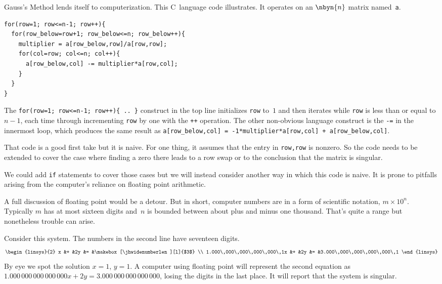 Gauss's Method lends itself to computerization.
This C~language 
code illustrates.
It operates on an $\nbyn{n}$ matrix named~\lstinline[style=inline]!a!.
\begin{lstlisting}
for(row=1; row<=n-1; row++){
  for(row_below=row+1; row_below<=n; row_below++){
    multiplier = a[row_below,row]/a[row,row];
    for(col=row; col<=n; col++){
      a[row_below,col] -= multiplier*a[row,col];
    }
  }
}
\end{lstlisting}
The 
\lstinline[style=inline]!for(row=1; row<=n-1; row++){ .. }!
construct in the top line
initializes \lstinline[style=inline]!row! to~$1$ and then iterates while
\lstinline[style=inline]!row! is less than or equal to $n-1$, each time through
incrementing \lstinline[style=inline]!row! by one with the 
\lstinline[style=inline]!++! operation.
The other non-obvious language 
construct is the \lstinline[style=inline]!-=! in the innermost
loop, which produces the same result as
\lstinline[style=inline]!a[row_below,col] = -1*multiplier*a[row,col] + a[row_below,col]!.

That code is a good first take but
it is naive.
For one thing, it assumes that 
the entry in
\lstinline[style=inline]!row,row! is nonzero.
So the code needs to be extended to cover
the case where finding a zero there leads to a row swap or to the
conclusion that the matrix is singular.

We could add \lstinline[style=inline]!if! statements to cover those cases 
but we will instead consider another way in which this code is naive.
It is prone to pitfalls arising from the computer's reliance on 
floating point arithmetic.

A full discussion of floating point would be a detour.
But in short, computer numbers are in a form of scientific notation,
$m\times 10^n$\!. 
Typically $m$ has at most sixteen digits and~$n$ is bounded
between about plus and minus one thousand.
That's quite a range but nonetheless trouble can arise.

Consider this system.
The numbers in the second line have seventeen digits.
\newlength{\jhwidenumberlen}
\settowidth{\jhwidenumberlen}{$3.000\,000\,000\,000\,000\,1$}
\begin{equation*}
   \begin{linsys}{2}
                   x &+ &2y &= &\makebox[\jhwidenumberlen][l]{$3$}  \\
     1.000\,000\,000\,000\,000\,1x &+ &2y &= &3.000\,000\,000\,000\,000\,1
   \end{linsys}
\end{equation*}
By eye we spot the solution $x=1$, $y=1$.
A computer
using floating point will represent the second
equation as 
$1.000\,000\,000\,000\,000x+2y=3.000\,000\,000\,000\,000$, losing the
digits in the last place.
It will report that the system is 
singular.

